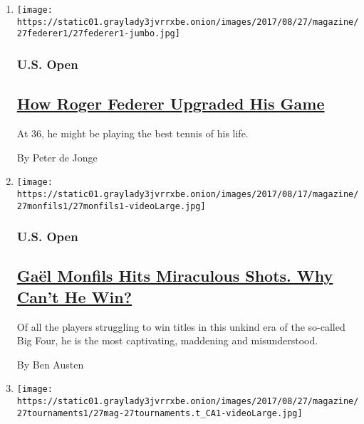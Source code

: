 \begin{enumerate}
\def\labelenumi{\arabic{enumi}.}
\item
  \texttt{[image: https://static01.graylady3jvrrxbe.onion/images/2017/08/27/magazine/27federer1/27federer1-jumbo.jpg]}

  \hypertarget{us-open}{%
  \subsubsection{U.S. Open}\label{us-open}}

  \hypertarget{how-roger-federer-upgraded-his-game}{%
  \subsection{\texorpdfstring{\href{/interactive/2017/08/24/magazine/usopen-federer-nadal-backhand-wonder-year.html}{How
  Roger Federer Upgraded His
  Game}}{How Roger Federer Upgraded His Game}}\label{how-roger-federer-upgraded-his-game}}

  At 36, he might be playing the best tennis of his life.

  By Peter de Jonge
\item
  \texttt{[image: https://static01.graylady3jvrrxbe.onion/images/2017/08/17/magazine/27monfils1/27monfils1-videoLarge.jpg]}

  \hypertarget{us-open-1}{%
  \subsubsection{U.S. Open}\label{us-open-1}}

  \hypertarget{gauxebl-monfils-hits-miraculous-shots-why-cant-he-win}{%
  \subsection{\texorpdfstring{\href{/interactive/2017/08/24/magazine/usopen-monfils-miraculous-shots.html}{Gaël
  Monfils Hits Miraculous Shots. Why Can't He
  Win?}}{Gaël Monfils Hits Miraculous Shots. Why Can't He Win?}}\label{gauxebl-monfils-hits-miraculous-shots-why-cant-he-win}}

  Of all the players struggling to win titles in this unkind era of the
  so-called Big Four, he is the most captivating, maddening and
  misunderstood.

  By Ben Austen
\item
  \texttt{[image: https://static01.graylady3jvrrxbe.onion/images/2017/08/27/magazine/27tournaments1/27mag-27tournaments.t\_CA1-videoLarge.jpg]}


\end{enumerate}
